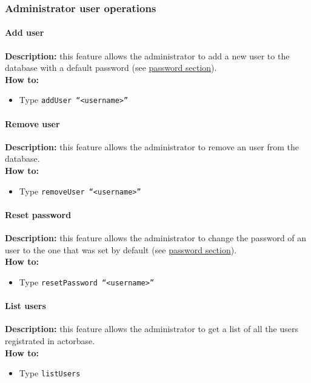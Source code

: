 \documentclass{scalatekids-article}
\begin{document}
\subsubsection{Administrator user operations}
\label{sec:administratoruser}

\paragraph{Add user}
\label{sec:adduser}
\textbf{Description:} this feature allows the administrator to add a new user to the database with a default password (see \hyperref[sec:passwordrequirement]{password section}).\\
\textbf{How to:}
\begin{itemize}
\item Type \texttt{addUser ``<username>''}
\end{itemize}

\paragraph{Remove user}
\label{sec:removeuser}
\textbf{Description:} this feature allows the administrator to remove an user from the database.\\
\textbf{How to:}
\begin{itemize}
\item Type \texttt{removeUser ``<username>''}
\end{itemize}

\paragraph{Reset password}
\label{sec:resetpassword}
\textbf{Description:} this feature allows the administrator to change the password of an user to the one that was set by default (see \hyperref[sec:passwordrequirement]{password section}).\\
\textbf{How to:}
\begin{itemize}
\item Type \texttt{resetPassword ``<username>''}
\end{itemize}

\paragraph{List users}
\label{sec:listusers}
\textbf{Description:} this feature allows the administrator to get a list of all the users 
registrated in actorbase.\\
\textbf{How to:}
\begin{itemize}
\item Type \texttt{listUsers}
\end{itemize}
\end{document}
